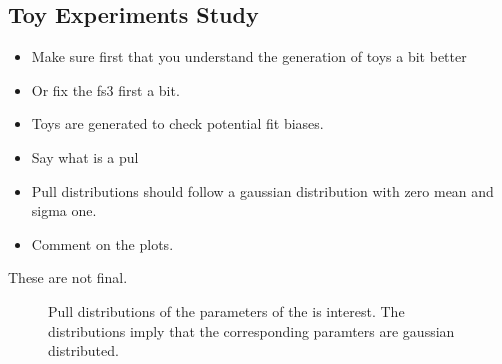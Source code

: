 
\subsection{Toy Experiments Study}
\label{Toy_Experiments_Study}


\begin{itemize}
\item Make sure first that you understand the generation of toys a bit better
\item Or fix the fs3 first a bit.
\item Toys are generated to check potential fit biases.
\item Say what is a pul
\item Pull distributions should follow a gaussian distribution with zero mean and sigma one.
\item Comment on the plots.
\end{itemize}

{\color{red} These are not final. }
\begin{figure}[h]
  \centering
  \begin{subfigure}{0.5\textwidth}
    \scalebox{0.60}{}
    \caption{}
    \label{pull_ACP0}
  \end{subfigure}%
  \hfill%
  \begin{subfigure}{0.5\textwidth}
    \scalebox{0.60}{}
    \caption{}
    \label{pull_ACPperp}
  \end{subfigure}
  \begin{subfigure}{0.5\textwidth}
    \scalebox{0.60}{}
    \caption{}
    \label{pull_ACPpar}
  \end{subfigure}%
  \hfill%
  \begin{subfigure}{0.5\textwidth}
    \scalebox{0.60}{}
    \caption{}
    \label{pull_ACPS}
  \end{subfigure}
\caption{Pull distributions of the parameters of the \Acp{i} interest. The distributions imply that the corresponding paramters are gaussian distributed.}
\end{figure}

\clearpage

